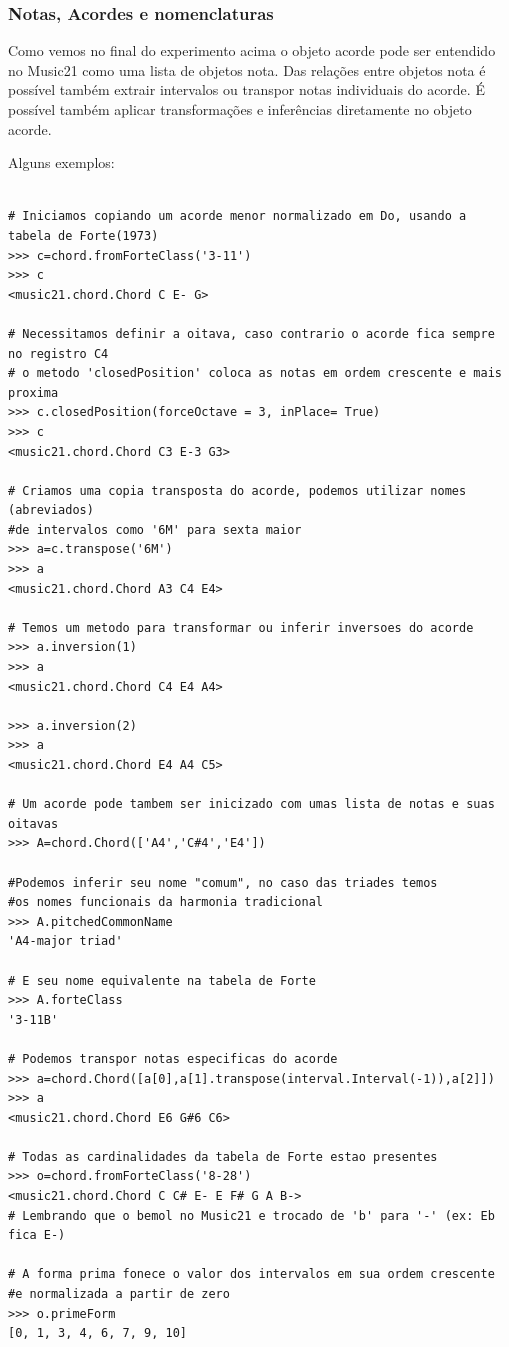 \documentclass[
	12pt,				%
	openright,			%
	twoside,			%
	a4paper,			%
	english,			%
	french,				%
	spanish,			%
	brazil				%
	]{abntex2}
\begin{document}
  
 
\subsubsection{Notas, Acordes e nomenclaturas}

Como vemos no final do experimento acima o objeto acorde pode ser entendido no Music21 como uma lista de objetos nota. Das relações entre objetos nota é possível também extrair intervalos ou transpor notas individuais do acorde. É possível também aplicar transformações e inferências diretamente no objeto acorde.

Alguns exemplos:

\begin{lstlisting}

# Iniciamos copiando um acorde menor normalizado em Do, usando a tabela de Forte(1973)
>>> c=chord.fromForteClass('3-11')
>>> c
<music21.chord.Chord C E- G>

# Necessitamos definir a oitava, caso contrario o acorde fica sempre no registro C4
# o metodo 'closedPosition' coloca as notas em ordem crescente e mais proxima
>>> c.closedPosition(forceOctave = 3, inPlace= True)
>>> c
<music21.chord.Chord C3 E-3 G3>

# Criamos uma copia transposta do acorde, podemos utilizar nomes (abreviados)  
#de intervalos como '6M' para sexta maior
>>> a=c.transpose('6M')
>>> a
<music21.chord.Chord A3 C4 E4>

# Temos um metodo para transformar ou inferir inversoes do acorde
>>> a.inversion(1)
>>> a
<music21.chord.Chord C4 E4 A4>

>>> a.inversion(2)
>>> a
<music21.chord.Chord E4 A4 C5>

# Um acorde pode tambem ser inicizado com umas lista de notas e suas oitavas
>>> A=chord.Chord(['A4','C#4','E4'])

#Podemos inferir seu nome "comum", no caso das triades temos 
#os nomes funcionais da harmonia tradicional
>>> A.pitchedCommonName
'A4-major triad'

# E seu nome equivalente na tabela de Forte
>>> A.forteClass
'3-11B'

# Podemos transpor notas especificas do acorde
>>> a=chord.Chord([a[0],a[1].transpose(interval.Interval(-1)),a[2]])
>>> a
<music21.chord.Chord E6 G#6 C6>

# Todas as cardinalidades da tabela de Forte estao presentes
>>> o=chord.fromForteClass('8-28')
<music21.chord.Chord C C# E- E F# G A B->
# Lembrando que o bemol no Music21 e trocado de 'b' para '-' (ex: Eb fica E-) 

# A forma prima fonece o valor dos intervalos em sua ordem crescente 
#e normalizada a partir de zero
>>> o.primeForm
[0, 1, 3, 4, 6, 7, 9, 10]


\end{lstlisting}
\end{document}
